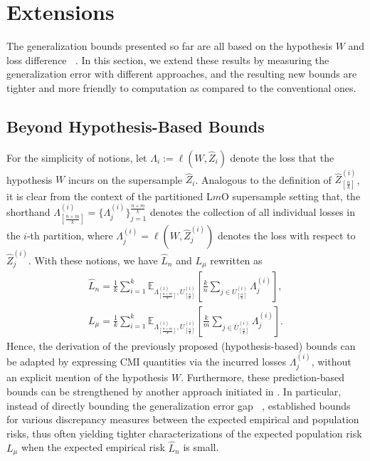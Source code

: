 \documentclass[onecolumn,romanappendices,10pt]{IEEEtran}
\newcommand{\EE}{{\mathbb{E}}}
\DeclareMathOperator{\gen}{\overline{gen}}
\begin{document}
	
	\section{Extensions}\label{sec:extensions}
	The generalization bounds presented so far are all based on the hypothesis $W$ and loss difference $\gen$. In this section, we extend these results by measuring the generalization error with different approaches, and the resulting new bounds are tighter and more friendly to computation as compared to the conventional ones.
	
	\subsection{Beyond Hypothesis-Based Bounds}
	For the simplicity of notions, let $\Lambda_i := \ell(W, \hat{Z}_i)$ denote the loss that the hypothesis $W$ incurs on the supersample $\hat{Z}_i$. Analogous to the definition of $\hat{Z}^{(i)}_{[\frac{n}{k}]}$, it is clear from the context of the partitioned L$m$O supersample setting that, the shorthand $\Lambda^{(i)}_{[\frac{n+m}{k}]} = \{\Lambda^{(i)}_j\}_{j=1}^{\frac{n+m}{k}}$ denotes the collection of all individual losses in the $i$-th partition, where $\Lambda^{(i)}_j = \ell(W, \hat{Z}^{(i)}_j)$ denotes the loss with respect to $\hat{Z}^{(i)}_j$. With these notions, we have $\widehat{L}_n$ and $L_\mu$ rewritten as
	\begin{align}
		\widehat{L}_n = \frac{1}{k} \sum_{i=1}^k \EE_{\Lambda^{(i)}_{[\frac{n+m}{k}]}, U^{(i)}_{[\frac{n}{k}]}} \left[ \frac{k}{n} \sum_{j \in U^{(i)}_{[\frac{n}{k}]}} \Lambda^{(i)}_j \right], \label{eq:lb-IP-exp-emp-risk}\\
		L_\mu = \frac{1}{k} \sum_{i=1}^k \EE_{\Lambda^{(i)}_{[\frac{n+m}{k}]}, U^{(i)}_{[\frac{n}{k}]}} \left[ \frac{k}{m} \sum_{j \in \bar{U}^{(i)}_{[\frac{n}{k}]}} \Lambda^{(i)}_j \right]. \label{eq:lb-IP-exp-pop-risk}
	\end{align}
	Hence, the derivation of the previously proposed (hypothesis-based) bounds can be adapted by expressing CMI quantities via the incurred losses $\Lambda^{(i)}_j$, without an explicit mention of the hypothesis $W$. Furthermore, these prediction-based bounds can be strengthened by another approach initiated in \cite{hellstrom2022new}. In particular, instead of directly bounding the generalization error gap $\gen$, \cite{hellstrom2022new, hellstrom2024comparing, dongexactly} established bounds for various discrepancy measures between the expected empirical and population risks, thus often yielding tighter characterizations of the expected population risk $L_\mu$ when the expected empirical risk $\widehat{L}_n$ is small. 
	
\end{document}

